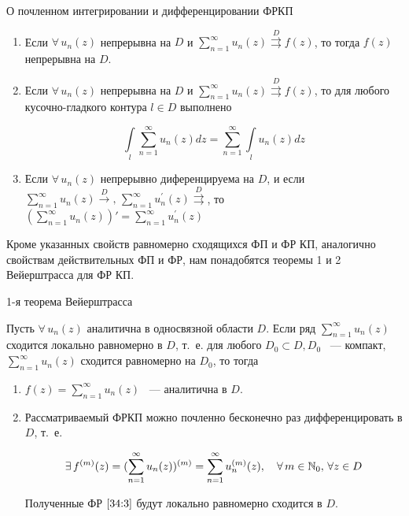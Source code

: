 \documentclass[../../main.tex]{subfiles}
\begin{document}
\begin{thm}{О почленном интегрировании и дифференцировании ФРКП}
	\begin{enumerate}
		\item Если $ \forall\, u_n (z) $ непрерывна на $ D $ и $ \sum\limits_{n = 
		1}^{\infty} u_n(z) \overset{D}\rightrightarrows f(z) $, то тогда $ f(z) $ 
		непрерывна на $ D $.
		
		\item Если $ \forall\, u_n (z) $ непрерывна на $ D $ и $ \sum\limits_{n = 
		1}^{\infty} u_n(z) \overset{D}\rightrightarrows f(z) $, то для любого 
		кусочно-гладкого контура $ l \in D $ выполнено
		
		\[ \int\limits_l \sum\limits_{n = 1}^{\infty} u_n(z) dz = \sum\limits_{n = 
		1}^{\infty} \int\limits_l  u_n(z) dz \]
		
		\item Если $ \forall\, u_n(z) $ непрерывно диференцируема на $ D $, и если $ 
		\sum\limits_{n = 1}^{\infty} u_n(z) \overset{D}{\longrightarrow},\, 
		\sum\limits_{n = 1}^{\infty} u_n^{'}(z) \overset{D}\rightrightarrows $, то $ 
		(\sum\limits_{n = 1}^{\infty} u_n(z))' = \sum\limits_{n = 1}^{\infty} 
		u_n^{'}(z) $
	\end{enumerate}
\end{thm}

Кроме указанных свойств равномерно сходящихся ФП и ФР КП, аналогично свойствам 
действительных ФП и ФР, нам понадобятся теоремы 1 и 2 Вейерштрасса для ФР КП.

\begin{thm}{1-я теорема Вейерштрасса}
	\;
	
	Пусть $ \forall\, u_n(z) $ аналитична в односвязной области $ D $. Если ряд $ 
	\sum\limits_{n = 1}^{\infty} u_n(z) $ сходится локально равномерно в $ D $, 
	т.~е. для любого $ D_0 \subset D, D_0 $ ~--- компакт, $ \sum\limits_{n = 
	1}^{\infty} u_n(z) $ сходится равномерно на $ D_0 $, то тогда
	
	\begin{enumerate}
		\item  $ f(z) = \sum\limits_{n = 1}^{\infty} u_n(z) $ ~--- аналитична в $ D 
		$.
		
		\item Рассматриваемый ФРКП можно почленно бесконечно раз дифференцировать в 
		$ D $, т.~е.
		
		\begin{equation}\label{34:3}
			 \exists\, f^{(m)}(z) = (\sum\limits_{n = 1}^{\infty} u_n(z))^{(m)} = 
			 \sum\limits_{n = 1}^{\infty} u_n^{(m)} (z), \quad \forall\, m \in \mathbb{N}_0,\, 
			 \forall z \in D
		\end{equation}
		
		Полученные ФР $ \eqref{34:3} $ будут локально равномерно сходится в $ D $.
	\end{enumerate}
\end{thm}
\end{document}

